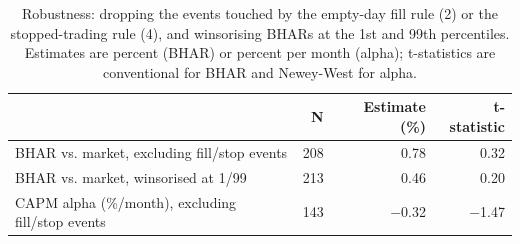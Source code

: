 \begin{table}[!htbp]
\centering
\small
\caption{Robustness: dropping the events touched by the empty-day fill rule (2) or the stopped-trading rule (4), and winsorising BHARs at the 1st and 99th percentiles. Estimates are percent (BHAR) or percent per month (alpha); t-statistics are conventional for BHAR and Newey-West for alpha.}
\label{tab:rob}
\begin{tabular}{p{8cm}rrr}
\toprule
 & N & Estimate (\%) & t-statistic \\
\midrule
BHAR vs. market, excluding fill/stop events & 208 & 0.78 & 0.32 \\
BHAR vs. market, winsorised at 1/99 & 213 & 0.46 & 0.20 \\
CAPM alpha (\%/month), excluding fill/stop events & 143 & $-$0.32 & $-$1.47 \\
\bottomrule
\end{tabular}
\end{table}
